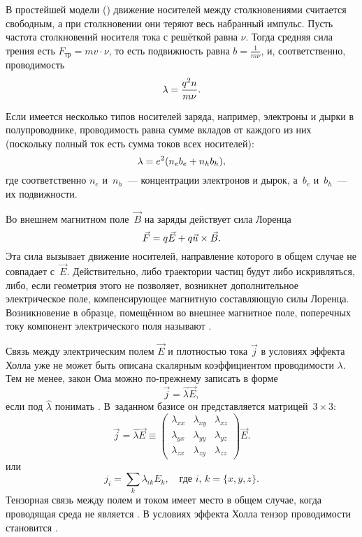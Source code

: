 В простейшей модели () движение носителей между столкновениями
считается свободным, а при столкновении они теряют весь набранный импульс.
Пусть частота столкновений носителя тока с решёткой равна $\nu$. Тогда
средняя сила трения есть $F_{тр}=mv \cdot \nu $, то есть подвижность
равна $b = \frac{1}{m\nu}$, и, соответственно, проводимость
\begin{equation}
    \eqmark{drude}
    \lambda = \frac{q^2 n}{m\nu}.
\end{equation}

Если имеется несколько типов носителей заряда, например, электроны
и дырки в полупроводнике, проводимость равна сумме вкладов от каждого из них
(поскольку полный ток есть сумма токов всех носителей):
\begin{equation}
    \eqmark{3.27}
    \lambda= e^2 (n_e b_e+n_h b_h),
\end{equation}
где соответственно $n_e$ и~$n_h$~--- концентрации электронов и дырок,
а~$b_e$ и~$b_h$~--- их подвижности.



Во внешнем магнитном поле~$\vec{B}$ на заряды действует сила Лоренца
\begin{equation}
\eqmark{F-lorentz}
 \vec{F} = q\vec{E}+q\vec{u}\times \vec{B}.
\end{equation}
Эта сила вызывает движение носителей, направление которого
в общем случае не совпадает с~$\vec{E}$.
Действительно, либо траектории частиц будут либо искривляться,
либо, если геометрия этого не позволяет, возникнет дополнительное электрическое
поле, компенсирующее магнитную составляющую силы Лоренца.
Возникновение в образце, помещённом во внешнее магнитное поле,
поперечных току компонент электрического поля называют .

Связь между электрическим полем $\vec{E}$ и плотностью тока $\vec{j}$ в
условиях эффекта Холла уже не может быть описана скалярным коэффициентом проводимости
$\lambda$. Тем не менее, закон Ома можно по-прежнему записать
в форме
\begin{equation}
\vec{j} = \hat{\lambda} \vec{E},
\end{equation}
если под $\hat{\lambda}$
понимать . В~заданном базисе он представляется
матрицей~$3\times 3$:
\begin{equation}
    \vec{j} =\hat{\lambda}\vec{E}\equiv \left(
    \begin{matrix}
     \lambda_{xx} & \lambda_{xy} & \lambda_{xz}\\
     \lambda_{yx} & \lambda_{yy} & \lambda_{yz}\\
     \lambda_{zx} & \lambda_{zy} & \lambda_{zz}
    \end{matrix}
\right) \vec{E}.
\end{equation}
или
\begin{equation*}
    j_{i} = \sum_{k} \lambda_{ik} E_k,\quad \text{где~}i,\,k=\{x,y,z\}.
\end{equation*}
Тензорная связь между полем и током имеет место в общем случае, когда
проводящая среда не является .
В условиях эффекта Холла тензор проводимости становится .


